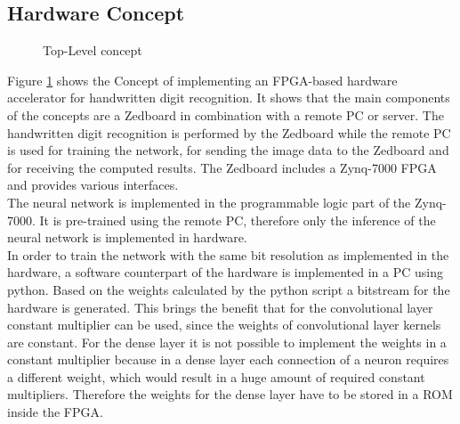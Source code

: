 \subsection{Hardware Concept}
\begin{figure}[h]
	\centering
	
	\caption[Top-Level concept.]{Top-Level concept}
	\label{FIG:concept}
\end{figure}
\noindent
Figure \ref{FIG:concept} shows the Concept of implementing an FPGA-based hardware accelerator for handwritten digit recognition. It shows that the main components of the concepts are a Zedboard in combination with a remote PC or server. The handwritten digit recognition is performed by the Zedboard while the remote PC is used for training the network, for sending the image data to the Zedboard and for receiving the computed results.  The Zedboard includes a Zynq-7000 FPGA and provides various interfaces. \\
The neural network is implemented in the programmable logic part of the Zynq-7000. It is pre-trained using the remote PC, therefore only the inference of the neural network is implemented in hardware. \\
In order to train the network with the same bit resolution as implemented in the hardware, a software counterpart of the hardware is implemented in a PC using python. 
Based on the weights calculated by the python script a bitstream for the hardware is generated. This brings the benefit that for the convolutional layer constant multiplier can be used, since the weights of convolutional layer kernels are constant. For the dense layer it is not possible to implement the weights in a constant multiplier because in a dense layer each connection of a neuron requires a different weight, which would result in a huge amount of required constant multipliers. Therefore the weights for the dense layer have to be stored in a ROM inside the FPGA.   \\
